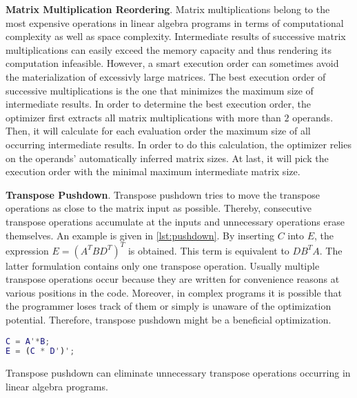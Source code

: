 \textbf{Matrix Multiplication Reordering}. Matrix multiplications belong to the most expensive operations in linear algebra programs in terms of computational complexity as well as space complexity. Intermediate results of successive matrix multiplications can easily exceed the memory capacity and thus rendering its computation infeasible. However, a smart execution order can sometimes avoid the materialization of excessivly large matrices. The best execution order of successive multiplications is the one that minimizes the maximum size of intermediate results.
In order to determine the best execution order, the optimizer first extracts all matrix multiplications with more than $2$ operands.
Then, it will calculate for each evaluation order the maximum size of all occurring intermediate results.
In order to do this calculation, the optimizer relies on the operands' automatically inferred matrix sizes.%
At last, it will pick the execution order with the minimal maximum intermediate matrix size.


\textbf{Transpose Pushdown}. Transpose pushdown tries to move the transpose operations as close to the matrix input as possible.
Thereby, consecutive transpose operations accumulate at the inputs and unnecessary operations erase themselves.
An example is given in \cref{lst:pushdown}. By inserting $C$ into $E$, the expression $E=(A^T BD^T)^T$ is obtained. This term is equivalent to $DB^T A$. The latter formulation contains only one transpose operation. Usually multiple transpose operations occur because they are written for convenience reasons at various positions in the code. Moreover, in complex programs it is possible that the programmer loses track of them or simply is unaware of the optimization potential. Therefore, transpose pushdown might be a beneficial optimization.

\begin{listing}[!h]
  \begin{CenteredBox}
    \begin{lstlisting}[language=Matlab]
C = A'*B;
E = (C * D')';
    \end{lstlisting}
  \end{CenteredBox}
  \caption{Transpose pushdown can eliminate unnecessary transpose operations occurring in linear algebra programs.}
  \label{lst:pushdown}
\end{listing}

